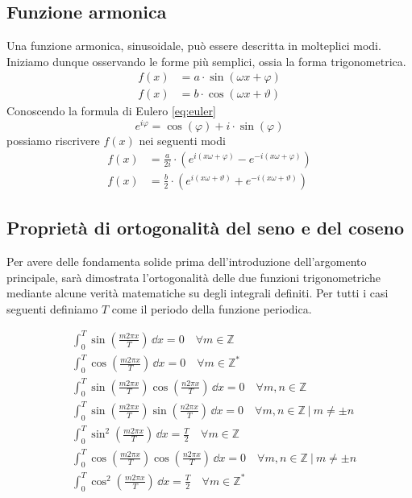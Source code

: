 \subsection{Funzione armonica}
Una funzione armonica, sinusoidale, pu\`o essere descritta in molteplici modi.
Iniziamo dunque osservando le forme pi\`u semplici, ossia la forma
trigonometrica.
\begin{align} \label{eq:harmonics-trig}
    f(x) &= a\cdot\sin (\omega x + \varphi) \\
    f(x) &= b\cdot\cos(\omega x + \vartheta)
\end{align}
Conoscendo la formula di Eulero \eqref{eq:euler}
\begin{equation} \label{eq:euler}
    e^{i\varphi} = \cos(\varphi) + i\cdot\sin(\varphi)
\end{equation}
possiamo riscrivere \(f(x)\) nei seguenti modi
\begin{align} \label{eq:harmonics-complex}
    f(x) &= \frac{a}{2i}\cdot(e^{i(x\omega + \varphi)} - e^{-i(x\omega + \varphi)}) \\
    f(x) &= \frac{b}{2}\cdot(e^{i(x\omega + \vartheta)} + e^{-i(x\omega + \vartheta)})
\end{align}

\subsection{Propriet\`a di ortogonalit\`a del seno e del coseno}
Per avere delle fondamenta solide prima dell'introduzione dell'argomento
principale, sar\`a dimostrata l'ortogonalit\`a delle due funzioni
trigonometriche mediante alcune verit\`a matematiche su degli integrali
definiti.  Per tutti i casi seguenti definiamo \(T\) come il periodo della
funzione periodica.

\begin{align*}
    & \int_0^T \sin(\frac{m2\pi x}{T})\,\dd{x} = 0
        \quad \forall m \in \mathbb{Z} \\
    & \int_0^T \cos(\frac{m2\pi x}{T})\,\dd{x} = 0
        \quad \forall m \in \mathbb{Z^*} \\
    & \int_0^T \sin(\frac{m2\pi x}{T})\cos(\frac{n2\pi x}{T})\,\dd{x} = 0
        \quad \forall m,n \in \mathbb{Z} \\
    & \int_0^T \sin(\frac{m2\pi x}{T})\sin(\frac{n2\pi x}{T})\,\dd{x} = 0 
        \quad \forall m,n \in \mathbb{Z}~|~m\neq \pm n \\
    & \int_0^T \sin^2(\frac{m2\pi x}{T})\,\dd{x} = \frac{T}{2}
        \quad \forall m \in \mathbb{Z} \\
    & \int_0^T \cos(\frac{m2\pi x}{T})\cos(\frac{n2\pi x}{T})\,\dd{x} = 0 
        \quad \forall m,n \in \mathbb{Z}~|~m\neq \pm n \\
    & \int_0^T \cos^2(\frac{m2\pi x}{T})\,\dd{x} = \frac{T}{2}
        \quad \forall m \in \mathbb{Z^*} \\
\end{align*}

